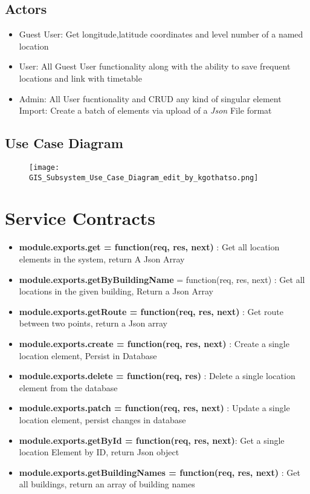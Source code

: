 \documentclass{article}
\begin{document}
	\subsection{Actors}
		\begin{itemize}
			\item Guest User: Get longitude,latitude coordinates and level number of a named location
			
			\item User: All Guest User functionality along with the ability to save frequent locations and link with timetable
			
 			\item Admin: All User fucntionality and CRUD any kind of singular element Import: Create a batch of elements via upload of a \textit{Json} File       format
  			
				
		\end{itemize}
		
	\subsection{Use Case Diagram}
		\begin{figure}[H]
			\texttt{[image: GIS\_Subsystem\_Use\_Case\_Diagram\_edit\_by\_kgothatso.png]}
		\end{figure}
	
\section{Service Contracts}
	
		\begin{itemize}
 			\item \textbf{module.exports.get = function(req, res, next)} : Get all location elements in the system, return A Json  Array
  			\item  \textbf{module.exports.getByBuildingName} = function(req, res, next) : Get all locations in the given building, Return a Json Array
  			\item \textbf{module.exports.getRoute = function(req, res, next)} : Get route between two points, return a Json array
  			\item \textbf{module.exports.create = function(req, res, next)} : Create a single location element, Persist in Database
  			\item \textbf{module.exports.delete = function(req, res)} : Delete a single location element from the database
  			\item \textbf{module.exports.patch = function(req, res, next)} : Update a single location element, persist changes in database
  			\item \textbf{module.exports.getById = function(req, res, next)}: Get a single location Element by ID, return Json object
			\item \textbf{module.exports.getBuildingNames = function(req, res, next)} : Get all buildings, return an array of building names
		\end{itemize}
\end{document}
